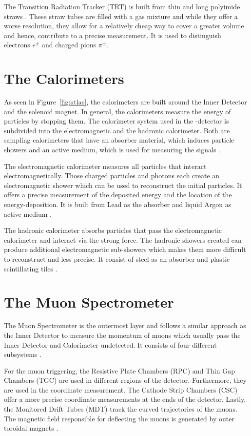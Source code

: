 \documentclass[bachelor,oneside, BCOR10mm,
			ngerman,english  %
]{GAUBM}
\begin{document}
The Transition Radiation Tracker (TRT) is built from thin and long polyimide straws \cite{atlas}. These straw tubes are filled with a gas mixture and while they offer a worse resolution, they allow for a relatively cheap way to cover a greater volume and hence, contribute to a precise measurement. It is used to distinguish electrons $e^\pm$ and charged pions $\pi^\pm$.

\section*{The Calorimeters}
As seen in Figure~\ref{fig:atlas}, the calorimeters are built around the Inner Detector and the solenoid magnet. In general, the calorimeters measure the energy of particles by stopping them. The calorimeter system used in the \atlas-detector is subdivided into the electromagnetic and the hadronic calorimeter. Both are sampling calorimeters that have an absorber material, which induces particle showers and an active medium, which is used for measuring the signals \cite{atlas_calorimeter}.

The electromagnetic calorimeter measures all particles that interact electromagnetically. Those charged particles and photons each create an electromagnetic shower which can be used to reconstruct the initial particles. It offers a precise measurement of the deposited energy and the location of the energy-deposition. It is built from Lead as the absorber and liquid Argon as active medium \cite{atlas_calorimeter}.

The hadronic calorimeter absorbs particles that pass the electromagnetic calorimeter and interact via the strong force. The hadronic showers created can produce additional electromagnetic sub-showers which makes them more difficult to reconstruct and less precise. It consist of steel as an absorber and plastic scintillating tiles \cite{atlas_calorimeter}.

\section*{The Muon Spectrometer}
The Muon Spectrometer is the outermost layer and follows a similar approach as the Inner Detector to measure the momentum of muons which usually pass the Inner Detector and Calorimeter undetected. It consists of four different subsystems \cite{atlas}. 

For the muon triggering, the Resistive Plate Chambers (RPC) and Thin Gap Chambers (TGC) are used in different regions of the detector. Furthermore, they are used in the coordinate measurement. The Cathode Strip Chambers (CSC) offer a more precise coordinate measurements at the ends of the detector. Lastly, the Monitored Drift Tubes (MDT) track the curved trajectories of the muons. The magnetic field responsible for deflecting the muons is generated by outer toroidal magnets \cite{atlas}.
\end{document}
